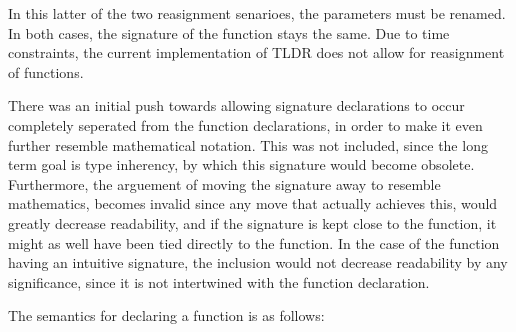 In this latter of the two reasignment senarioes, the parameters must be renamed. In both cases, the signature of the function stays the same. Due to time constraints, the current implementation of TLDR does not allow for reasignment of functions.

There was an initial push towards allowing signature declarations to occur completely seperated from the function declarations, in order to make it even further resemble mathematical notation. This was not included, since the long term goal is type inherency, by which this signature would become obsolete. Furthermore, the arguement of moving the signature away to resemble mathematics, becomes invalid since any move that actually achieves this, would greatly decrease readability, and if the signature is kept close to the function, it might as well have been tied directly to the function. In the case of the function having an intuitive signature, the inclusion would not decrease readability by any significance, since it is not intertwined with the function declaration.

The semantics for declaring a function is as follows:
